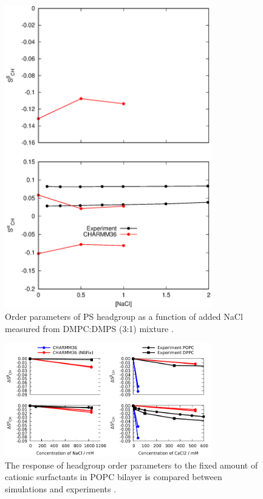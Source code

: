 \documentclass[aps,prl,superscriptaddress,twocolumn]{revtex4}
\begin{document}
\begin{figure}[]
  \centering
  \includegraphics[width=9.0cm]{../Figs/PSresponseTONaCl.eps}
  \caption{\label{PSresponseTONaCl}
    Order parameters of PS headgroup as a function of added NaCl measured from DMPC:DMPS (3:1) mixture \cite{roux86}.
  }
\end{figure}

\begin{figure}[]
  \centering
  \includegraphics[width=9.0cm]{../Figs/OP_CHARMM_CaCl_POPC_NBFix.pdf}
  \caption{\label{OP_CHARMM_CaCl_POPC_NBFix}
  The response of headgroup order parameters to the fixed amount of cationic surfactants in
  POPC bilayer is compared between simulations and experiments \cite{scherer89}.}
\end{figure}
\end{document}
